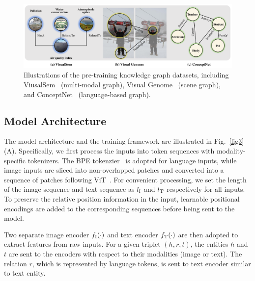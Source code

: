 
\begin{figure}[t]
  \centering
  \includegraphics[width=1.0\linewidth]{3.pdf}
  \caption{Illustrations of the pre-training knowledge graph datasets, including ViusalSem~\cite{visualsem} (multi-modal graph), Visual Genome~\cite{vgdata} (scene graph), and ConceptNet~\cite{conceptnet} (language-based graph).}
  \label{fig2}
\end{figure}

\subsection{Model Architecture}
The model architecture and the training framework are illustrated in Fig.~\ref{fig3}(A). Specifically, we first process the inputs into token sequences with modality-specific tokenizers. The BPE tokenzier~\cite{bpe} is adopted for language inputs, while image inputs are sliced into non-overlapped patches and converted into a sequence of patches following ViT~\cite{vit}. For convenient processing, we set the length of the image sequence and text sequence as $l_{\rm I}$ and $l_{\rm T}$ respectively for all inputs. To preserve the relative position information in the input, learnable positional encodings are added to the corresponding sequences before being sent to the model.

Two separate image encoder $f_{\rm I}(\cdot)$ and text encoder $f_{\rm T}(\cdot)$ are then adopted to extract features from raw inputs. For a given triplet $(h,r,t)$, the entities $h$ and $t$ are sent to the encoders with respect to their modalities (image or text). The relation $r$, which is represented by language tokens, is sent to text encoder similar to text entity. 

